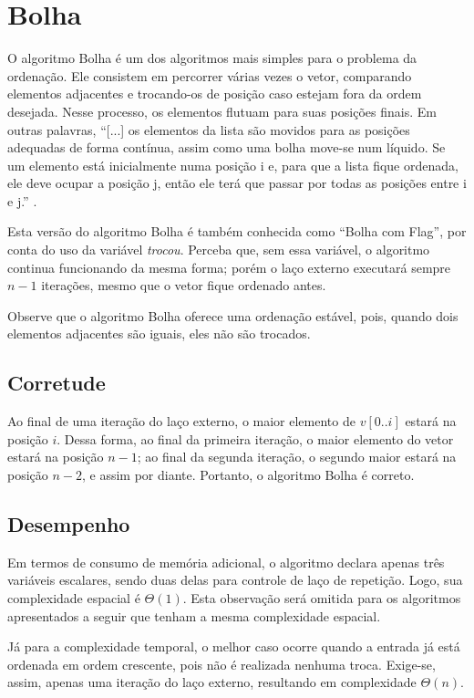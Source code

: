 \section{Bolha}
O algoritmo Bolha é um dos algoritmos mais simples para o problema da ordenação. Ele consistem em percorrer várias vezes o vetor, comparando elementos adjacentes e trocando-os de posição caso estejam fora da ordem desejada. Nesse processo, os elementos flutuam para suas posições finais. Em outras palavras, ``[...]  os elementos da lista são movidos para as posições adequadas de forma contínua, assim como uma bolha move-se num líquido. Se um elemento está inicialmente numa posição i e, para que a lista fique ordenada, ele deve ocupar a posição j, então ele terá que passar por todas as posições entre i e j.'' \cite[p.8]{viana2011pesquisa}.



Esta versão do algoritmo Bolha é também conhecida como ``Bolha com Flag'', por conta do uso da variável \textit{trocou}. Perceba que, sem essa variável, o algoritmo continua funcionando da mesma forma; porém o laço externo executará sempre $n - 1$ iterações, mesmo que o vetor fique ordenado antes.

Observe que o algoritmo Bolha oferece uma ordenação estável, pois, quando dois elementos adjacentes são iguais, eles não são trocados.

\subsection*{Corretude}
Ao final de uma iteração do laço externo, o maior elemento de $v[0..i]$ estará na posição $i$. Dessa forma, ao final da primeira iteração, o maior elemento do vetor estará na posição $n - 1$; ao final da segunda iteração, o segundo maior estará na posição $n - 2$, e assim por diante. Portanto, o algoritmo Bolha é correto.

\subsection*{Desempenho}
Em termos de consumo de memória adicional, o algoritmo declara apenas três variáveis escalares, sendo duas delas para controle de laço de repetição. Logo, sua complexidade espacial é $\Theta(1)$. Esta observação será omitida para os algoritmos apresentados a seguir que tenham a mesma complexidade espacial.

Já para a complexidade temporal, o melhor caso ocorre quando a entrada já está ordenada em ordem crescente, pois não é realizada nenhuma troca. Exige-se, assim, apenas uma iteração do laço externo, resultando em complexidade $\Theta(n)$.

